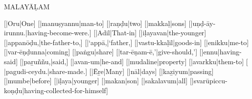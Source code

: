 




\def\malstrut{\leavevmode\lower6pt\vbox to20pt{}}
\def\firststyle{\malstrut}
\def\secondstyle{\rm}
\def\thirdstyle{\it}

\raggedbottom
\emergencystretch=30pt
\parindent=0pt

\centerline{{\mmtr MALAY\=A\d LAM}}
\bigskip

\beginthreelines

[{\mm {}}|{\mmtr Oru}|One] [{\mm {}}|{\mmtr manu\d syannu}|man-to]
[{\mm {}}|{\mmtr ra\d n\d du}|two] [{\mm {}}|{\mmtr makka\d l}|sons]
[{\mm {}}|{\mmtr u\d n\d d-\=ay-irunnu.}|having-become-were.]
[{\mm {}}|{\mmtr Adil}|That-in] [{\mm {}}|{\mmtr i\d layavan}|the-younger]
[{\mm {}}|{\mmtr appan\=o\d du,}|the-father-to,]
[{}|{\mmtr `app\=a,}|`father,]
[{\mm {}}|{\mmtr vastu-kka\d lil}|goods-in] [{\mm {}}|{\mmtr enikku}|me-to]
[{\mm {}}|{\mmtr var-\=e\d n\d dunna}|coming] [{\mm {}}|{\mmtr pa\.ngu}|share]
[{\mm {}}|{\mmtr tar-\=e\d nam-\=e,'}|give-should,']
[{\mm {}}|{\mmtr ennu}|having-said] [{\mm {}}|{\mmtr pa\b ru\~n\~nu,}|said,]
[{\mm {}}|{\mmtr avan-um}|he-and] [{\mm {}}|{\mmtr mudaline}|property]
[{\mm {}}|{\mmtr avarkku}|them-to] 
[{\mm {} }|{\mmtr pagudi-ceydu.}|share-made.]
[{\mm {}}|{\mmtr \=E\b re}|Many] [{\mm {}}|{\mmtr n\=al}|days]
[{\mm {}}|{\mmtr ka\b ziyum}|passing] [{\mm {}}|{\mmtr mumbe}|before]
[{\mm {}}|{\mmtr i\d laya}|younger] [{\mm {}}|{\mmtr makan}|son]
[{\mm {}}|{\mmtr sakalavum}|all]
[{\mm {}}|{\mmtr svar\=upiccu-ko\d n\d du}|having-collected-for-himself]
